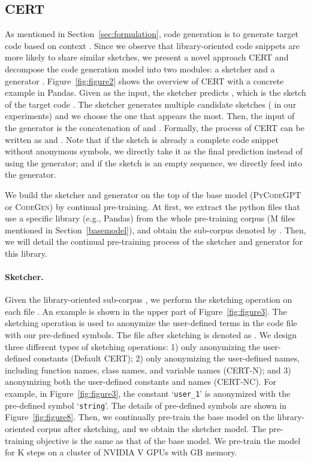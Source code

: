 \documentclass{article}
\newcommand{\cert}{\textsc{CERT}\xspace}
\newcommand{\codepy}{\textsc{PyCodeGPT}\xspace}
\newcommand{\codegen}{\textsc{CodeGen}\xspace}
\newcommand{\pandas}{Pandas\xspace}
\begin{document}
\subsection{\cert}\label{cert}
As mentioned in Section~\ref{sec:formulation}, code generation is to generate target code  based on context . 
Since we observe that library-oriented code snippets are more likely to share similar sketches, we present a novel approach \cert and decompose the code generation model  into two modules: a sketcher  and a generator .
Figure~\ref{fig:figure2} shows the overview of \cert with a concrete example in \pandas. Given  as the input, the sketcher predicts , which is the sketch of the target code . The sketcher generates multiple candidate sketches ( in our experiments) and we choose the one that appears the most. Then, the input of the generator is the concatenation of  and . Formally, the process of \cert can be written as  and .
Note that if the sketch  is already a complete code snippet without anonymous symbols, we directly take it as the final prediction instead of using the generator; and if the sketch  is an empty sequence, we directly feed  into the generator. 

We build the sketcher and generator on the top of the base model (\codepy or \codegen) by continual pre-training. At first, we extract the python files that use a specific library (e.g., \pandas) from the whole pre-training corpus (M files mentioned in Section~\ref{basemodel}), and obtain the sub-corpus denoted by . 
Then, we will detail the continual pre-training process of the sketcher and generator for this library.

\paragraph{Sketcher.}
Given the library-oriented sub-corpus , we perform the sketching operation on each file . An example is shown in the upper part of Figure~\ref{fig:figure3}. The sketching operation is used to anonymize the user-defined terms in the code file with our pre-defined symbols. The file after sketching is denoted as . We design three different types of sketching operations: 1) only anonymizing the user-defined constants (Default \cert); 2) only anonymizing the user-defined names, including function names, class names, and variable names (\cert-N); and 3) anonymizing both the user-defined constants and names (\cert-NC). For example, in Figure~\ref{fig:figure3}, the constant `\texttt{user\_1}' is anonymized with the pre-defined symbol `\texttt{string}'. The details of pre-defined symbols are shown in Figure~\ref{fig:figure8}. Then, we continually pre-train the base model on the library-oriented corpus after sketching, and we obtain the sketcher model. The pre-training objective is the same as that of the base model. We pre-train the model for K steps on a cluster of  NVIDIA V GPUs with GB memory. 
\end{document}
